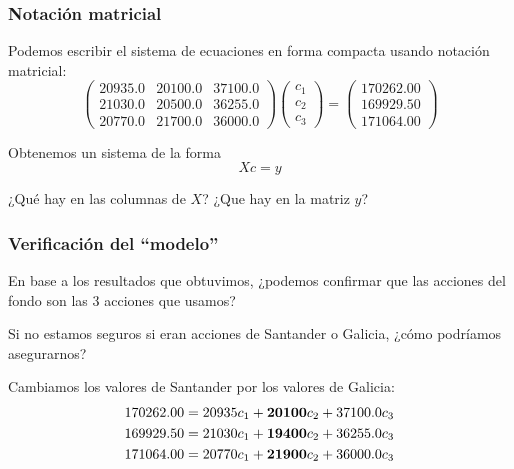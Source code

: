 \documentclass[aspectratio=169,12pt]{beamer}
\begin{document}
\begin{frame}
\frametitle{Notación matricial}

Podemos escribir el sistema de ecuaciones
en forma compacta usando notación matricial:
$$
\begin{pmatrix}
20935.0	& 20100.0 & 37100.0 \\
21030.0	& 20500.0 & 36255.0 \\
20770.0	& 21700.0 & 36000.0
\end{pmatrix}
\begin{pmatrix}
c_1 \\
c_2 \\
c_3
\end{pmatrix} = 
\begin{pmatrix}
170262.00 \\
169929.50 \\
171064.00
\end{pmatrix}
$$

Obtenemos un sistema de la forma
$$
X c = y
$$

¿Qué hay en las columnas de $X$? ¿Que hay en la matriz $y$?



\end{frame}


\begin{frame}
\frametitle{Verificación del ``modelo''}

En base a los resultados que obtuvimos, ¿podemos confirmar que las acciones del fondo son las 3 acciones que usamos?

Si no estamos seguros si eran acciones de Santander o Galicia, ¿cómo podríamos asegurarnos?

Cambiamos los valores de Santander por los valores de Galicia:
\begin{align*}
170262.00	&= 20935	c_1 + {\bf 20100} c_2 + 37100.0 c_3 \\
169929.50	&= 21030	c_1 + {\bf 19400} c_2 + 36255.0 c_3 \\
171064.00	&= 20770	c_1 + {\bf 21900} c_2 + 36000.0 c_3
\end{align*}


\end{frame}


\end{document}
